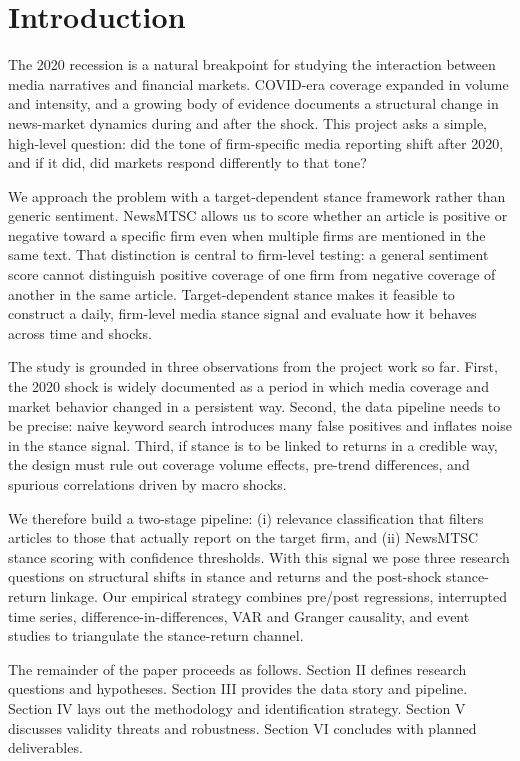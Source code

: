 \documentclass[conference]{IEEEtran}
\begin{document}
\section{Introduction}
The 2020 recession is a natural breakpoint for studying the interaction between media narratives and financial markets. COVID-era coverage expanded in volume and intensity, and a growing body of evidence documents a structural change in news-market dynamics during and after the shock. This project asks a simple, high-level question: did the tone of firm-specific media reporting shift after 2020, and if it did, did markets respond differently to that tone?

We approach the problem with a target-dependent stance framework rather than generic sentiment. NewsMTSC allows us to score whether an article is positive or negative toward a specific firm even when multiple firms are mentioned in the same text. That distinction is central to firm-level testing: a general sentiment score cannot distinguish positive coverage of one firm from negative coverage of another in the same article. Target-dependent stance makes it feasible to construct a daily, firm-level media stance signal and evaluate how it behaves across time and shocks.

The study is grounded in three observations from the project work so far. First, the 2020 shock is widely documented as a period in which media coverage and market behavior changed in a persistent way. Second, the data pipeline needs to be precise: naive keyword search introduces many false positives and inflates noise in the stance signal. Third, if stance is to be linked to returns in a credible way, the design must rule out coverage volume effects, pre-trend differences, and spurious correlations driven by macro shocks.

We therefore build a two-stage pipeline: (i) relevance classification that filters articles to those that actually report on the target firm, and (ii) NewsMTSC stance scoring with confidence thresholds. With this signal we pose three research questions on structural shifts in stance and returns and the post-shock stance-return linkage. Our empirical strategy combines pre/post regressions, interrupted time series, difference-in-differences, VAR and Granger causality, and event studies to triangulate the stance-return channel.

The remainder of the paper proceeds as follows. Section II defines research questions and hypotheses. Section III provides the data story and pipeline. Section IV lays out the methodology and identification strategy. Section V discusses validity threats and robustness. Section VI concludes with planned deliverables.
\end{document}
